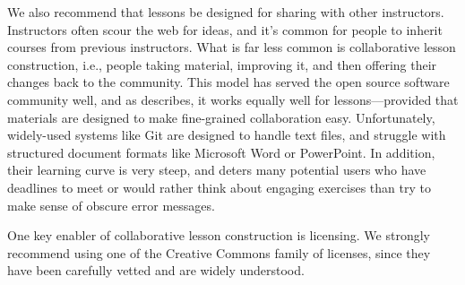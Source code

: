 \documentclass[10pt,letterpaper]{article}
\begin{document}
We also recommend that lessons be designed for sharing with other instructors.
Instructors often scour the web for ideas, and it's common for people to inherit
courses from previous instructors.  What is far less common is collaborative
lesson construction, i.e., people taking material, improving it, and then
offering their changes back to the community.  This model has served the open
source software community well, and as \cite{Deve2018} describes, it works
equally well for lessons---provided that materials are designed to make
fine-grained collaboration easy.  Unfortunately, widely-used systems like Git
are designed to handle text files, and struggle with structured document formats
like Microsoft Word or PowerPoint.  In addition, their learning curve is very
steep, and deters many potential users who have deadlines to meet or would
rather think about engaging exercises than try to make sense of obscure error
messages.

One key enabler of collaborative lesson construction is licensing.  We strongly
recommend using one of the Creative Commons family of licenses, since they have
been carefully vetted and are widely understood.


\end{document}
